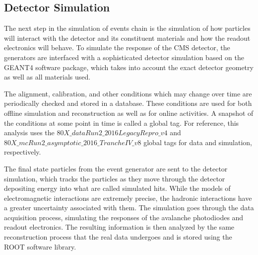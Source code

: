 \subsection{Detector Simulation}

The next step in the simulation of events chain is the simulation of how particles will interact with the detector and its constituent materials and how the readout electronics will behave. To simulate the response of the CMS detector, the generators are interfaced with a sophisticated detector simulation based on the GEANT4\cite{geant4sim} software package, which takes into account the exact detector geometry as well as all materials used.

The alignment, calibration, and other conditions which may change over time are periodically checked and stored in a database. These conditions are used for both offline simulation and reconstruction as well as for online activities. A snapshot of the conditions at some point in time is called a global tag. For reference, this analysis uses the $80X\_dataRun2\_2016LegacyRepro\_v4$ and $80X\_mcRun2\_asymptotic\_2016\_TrancheIV\_v8$ global tags for data and simulation, respectively. 

The final state particles from the event generator are sent to the detector simulation, which tracks the particles as they move through the detector depositing energy into what are called simulated hits. While the models of electromagnetic interactions are extremely precise, the hadronic interactions have a greater uncertainty associated with them. The simulation goes through the data acquisition process, simulating the responses of the avalanche photodiodes and readout electronics. The resulting information is then analyzed by the same reconstruction process that the real data undergoes and is stored using the ROOT software library. 

